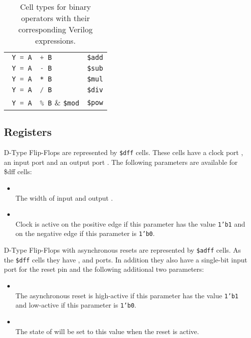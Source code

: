 \begin{table}[t!]
\begin{tabular}[t]{ll}
\hline
\lstinline[language=Verilog]; Y = A  + B; & {\tt \$add} \\
\lstinline[language=Verilog]; Y = A  - B; & {\tt \$sub} \\
\lstinline[language=Verilog]; Y = A  * B; & {\tt \$mul} \\
\lstinline[language=Verilog]; Y = A  / B; & {\tt \$div} \\
\lstinline[language=Verilog]; Y = A  % B; & {\tt \$mod} \\
\lstinline[language=Verilog]; Y = A ** B; & {\tt \$pow} \\
\end{tabular}
\caption{Cell types for binary operators with their corresponding Verilog expressions.}
\label{tab:CellLib_binary}
\end{table}

\subsection{Registers}

D-Type Flip-Flops are represented by {\tt \$dff} cells. These cells have a clock port ,
an input port  and an output port . The following parameters are available for \$dff
cells:

\begin{itemize}
\item {} \\
The width of input  and output .

\item {} \\
Clock is active on the positive edge if this parameter has the value {\tt 1'b1} and on the negative
edge if this parameter is {\tt 1'b0}.
\end{itemize}

D-Type Flip-Flops with asynchronous resets are represented by {\tt \$adff} cells. As the {\tt \$dff}
cells they have ,  and  ports. In addition they also have a single-bit 
input port for the reset pin and the following additional two parameters:

\begin{itemize}
\item {} \\
The asynchronous reset is high-active if this parameter has the value {\tt 1'b1} and low-active
if this parameter is {\tt 1'b0}.

\item {} \\
The state of  will be set to this value when the reset is active.
\end{itemize}

